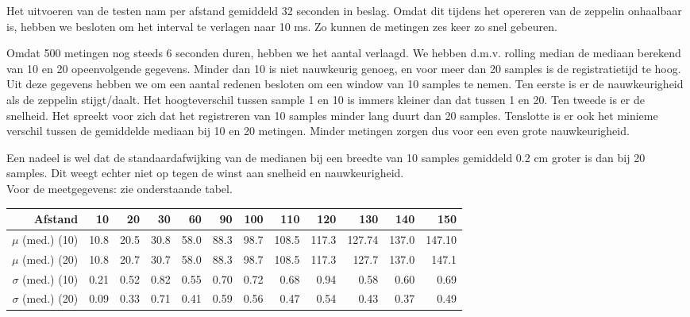 \documentclass{peno-opdracht3}
\begin{document}
Het uitvoeren van de testen nam per afstand gemiddeld 32 seconden in beslag. Omdat dit tijdens het opereren van de zeppelin onhaalbaar is, hebben we besloten om het interval te verlagen naar 10 ms. Zo kunnen de metingen zes keer zo snel gebeuren. 

Omdat 500 metingen nog steeds 6 seconden duren, hebben we het aantal verlaagd. We hebben d.m.v. rolling median de mediaan berekend van 10 en 20 opeenvolgende gegevens. Minder dan 10 is niet nauwkeurig genoeg, en voor meer dan 20 samples is de registratietijd te hoog. Uit deze gegevens hebben we om een aantal redenen besloten om een window van 10 samples te nemen.  Ten eerste is er de nauwkeurigheid als de zeppelin stijgt/daalt. Het hoogteverschil tussen sample 1 en 10 is immers kleiner dan dat tussen 1 en 20. Ten tweede is er de snelheid. Het spreekt voor zich dat het registreren van 10 samples minder lang duurt dan 20 samples. Tenslotte is er ook het minieme verschil tussen de gemiddelde mediaan bij 10 en 20 metingen. Minder metingen zorgen dus voor een even grote nauwkeurigheid. 

Een nadeel is wel dat de standaardafwijking van de medianen bij een breedte van 10 samples gemiddeld 0.2 cm groter is dan bij 20 samples. Dit weegt echter niet op tegen de winst aan snelheid en nauwkeurigheid.\\ 

Voor de meetgegevens: zie onderstaande tabel. \\

\begin{tabular}{r||r|r|r|r|r|r|r|r|r|r|r}
\textbf{Afstand} & 10 & 20 & 30 & 60 & 90 & 100 & 110 & 120 & 130 & 140 & 150 \\
\hline \hline 
$\mu$ (med.) (10) & 10.8 & 20.5 & 30.8 & 58.0 & 88.3 & 98.7 & 108.5 & 117.3 & 127.74 & 137.0 & 147.10 \\
$\mu$ (med.) (20) & 10.8 & 20.7 & 30.7 & 58.0 & 88.3 & 98.7 & 108.5 & 117.3 & 127.7 & 137.0 & 147.1 \\
$\sigma$ (med.) (10) & 0.21 & 0.52 & 0.82 & 0.55 & 0.70 & 0.72 & 0.68 & 0.94 & 0.58 & 0.60 & 0.69 \\
$\sigma$ (med.) (20)& 0.09 & 0.33 & 0.71 & 0.41 & 0.59 & 0.56 & 0.47 & 0.54 & 0.43 & 0.37 & 0.49 \\
\end{tabular}
\end{document}
